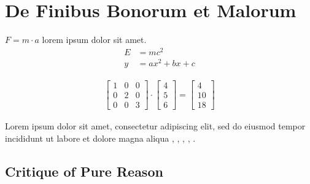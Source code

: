 \clearpage %
\section{De Finibus Bonorum et Malorum}

\lipsum[2] $F = m \cdot a$ lorem ipsum dolor sit amet.
\begin{align*}
    E & = mc^2          \\
    y & = ax^2 + bx + c
\end{align*}

\lipsum[3]
\begin{align}
    \begin{bmatrix}
        1 & 0 & 0 \\
        0 & 2 & 0 \\
        0 & 0 & 3
    \end{bmatrix} \cdot
    \begin{bmatrix}
        4 \\
        5 \\
        6
    \end{bmatrix} =
    \begin{bmatrix}
        4  \\
        10 \\
        18
    \end{bmatrix}
\end{align}

\lipsum[4] Lorem ipsum dolor sit amet, consectetur adipiscing elit, sed do eiusmod tempor incididunt ut labore et dolore magna aliqua \cite{szczypiorski2015}, \cite{duqu2011}, \cite{shs2015}, \cite{wozniak2018}, \cite{dcp19}.

\subsection{Critique of Pure Reason}
\kant[1]

